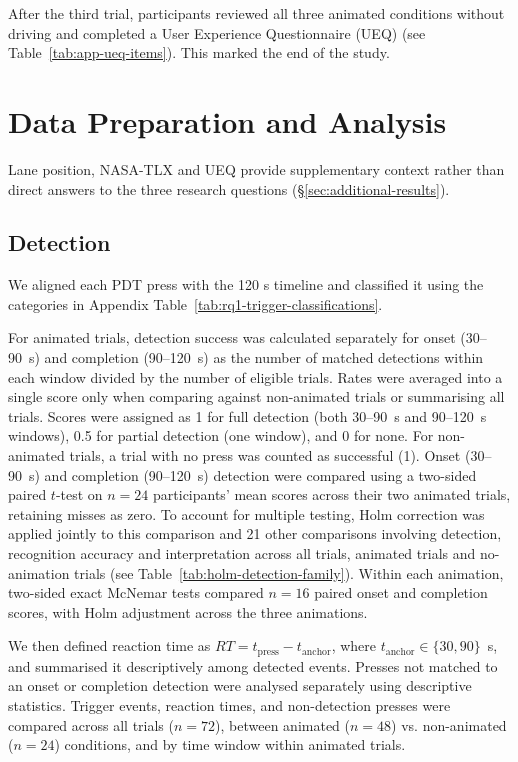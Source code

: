 \documentclass[
english,                 %
bibtex,                  %
includeExtraAbstracts, %
]{kththesis}
\numberwithin{listing}{chapter}
\begin{document}
After the third trial, participants reviewed all three animated conditions without driving and completed a User Experience Questionnaire (UEQ) (see Table~\ref{tab:app-ueq-items}). This marked the end of the study.

\section{Data Preparation and Analysis}
\label{sec:data-analysis}




Lane position, NASA-TLX and UEQ provide supplementary context rather than direct answers to the three research questions (\S\ref{sec:additional-results}).

\subsection{Detection}
\label{sec:detection}

We aligned each PDT press with the 120 s timeline and classified it using the categories in Appendix Table~\ref{tab:rq1-trigger-classifications}.

 
For animated trials, detection success was calculated separately for onset (30–90~s) and completion (90–120~s) as the number of matched detections within each window divided by the number of eligible trials. Rates were averaged into a single score only when comparing against non-animated trials or summarising all trials. Scores were assigned as 1 for full detection (both 30–90~s and 90–120~s windows), 0.5 for partial detection (one window), and 0 for none. For non-animated trials, a trial with
no press was counted as successful (1). Onset (30--90~s) and completion (90--120~s) detection were compared using a two-sided paired $t$-test on $n = 24$ participants' mean scores across their two animated trials, retaining misses as zero. To account for multiple testing, Holm correction was applied jointly to this comparison and 21 other comparisons involving detection, recognition accuracy and interpretation across all trials, animated trials and no-animation trials (see Table~\ref{tab:holm-detection-family}). Within each animation, two-sided exact McNemar tests compared $n = 16$ paired onset and completion scores, with Holm adjustment across the three animations.

We then defined reaction time as \(RT = t_{\mathrm{press}} - t_{\mathrm{anchor}}\), where \(t_{\mathrm{anchor}}\in\{30,90\}\)~s, and summarised it descriptively among detected
events. Presses not matched to an onset or completion detection were analysed separately using descriptive statistics.  Trigger events, reaction times, and non-detection presses were compared across all trials ($n = 72$), between animated ($n = 48$) vs. non-animated ($n = 24$) conditions, and by time window within animated trials.
\end{document}
